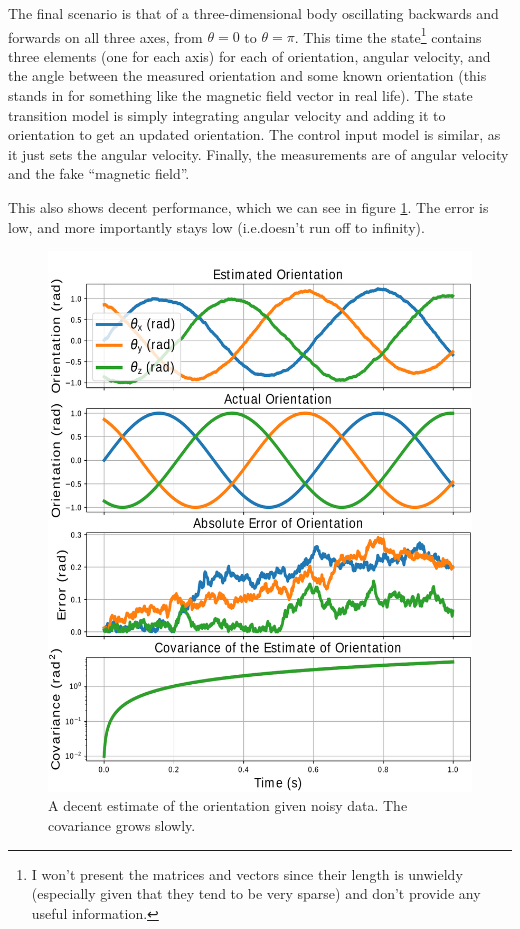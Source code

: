 \documentclass[12pt]{article}
\begin{document}
The final scenario is that of a three-dimensional body oscillating backwards and forwards on all three axes, from $\theta=0$ to $\theta=\pi$. This time the state\footnote{I won't present the matrices and vectors since their length is unwieldy (especially given that they tend to be very sparse) and don't provide any useful information.} contains three elements (one for each axis) for each of orientation, angular velocity, and the angle between the measured orientation and some known orientation (this stands in for something like the magnetic field vector in real life). The state transition model is simply integrating angular velocity and adding it to orientation to get an updated orientation. The control input model is similar, as it just sets the angular velocity. Finally, the measurements are of angular velocity and the fake ``magnetic field''.

This also shows decent performance, which we can see in figure \ref{3d_orient_fig}. The error is low, and more importantly stays low (i.e.\@ doesn't run off to infinity).

\begin{figure}[thp]
	\centering
	
	\includegraphics[width=\textwidth]{3d-orientation.pdf}
	
	\caption{A decent estimate of the orientation given noisy data. The covariance grows slowly.}
	\label{3d_orient_fig}
\end{figure}
\end{document}
